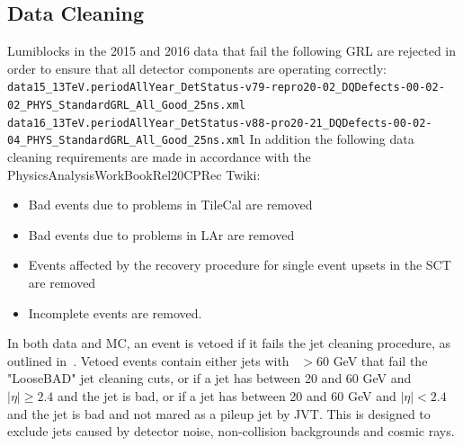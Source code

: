 \subsection{Data Cleaning}
\label{sec:cleaning}
Lumiblocks in the 2015 and 2016 data that fail the following GRL are rejected in order to ensure that all detector components are operating correctly:
\\ 
\noindent
{ \scriptsize
\verb|data15_13TeV.periodAllYear_DetStatus-v79-repro20-02_DQDefects-00-02-02_PHYS_StandardGRL_All_Good_25ns.xml|\\
\verb|data16_13TeV.periodAllYear_DetStatus-v88-pro20-21_DQDefects-00-02-04_PHYS_StandardGRL_All_Good_25ns.xml|
}
In addition the following data cleaning requirements are made in accordance with the PhysicsAnalysisWorkBookRel20CPRec Twiki\cite{DataCleaning}:
\begin{itemize}
\item Bad events due to problems in TileCal are removed 
\item Bad events due to problems in LAr are removed
\item Events affected by the recovery procedure for single event upsets in the SCT are removed
\item Incomplete events are removed.
\end{itemize}

In both data and MC, an event is vetoed if it fails the jet cleaning procedure, as outlined in~\cite{JetCleaning2016}. Vetoed events contain either jets with \pt~$>$60 GeV that fail the "LooseBAD" jet cleaning cuts, or if a jet has \pt between 20 and 60 GeV and $|\eta| \geq 2.4$ and the jet is bad, or if a jet has \pt between 20 and 60 GeV and $|\eta| < 2.4$ and the jet is bad and not mared as a pileup jet by JVT. This is designed to exclude jets caused by detector noise, non-collision backgrounds and cosmic rays. 
  
